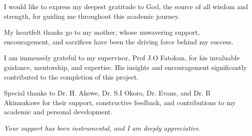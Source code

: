 \vspace*{2cm}
  
  \large
  I would like to express my deepest gratitude to God, the source of all wisdom and strength, for guiding me throughout this academic journey.

  \vspace{0.5cm}
  My heartfelt thanks go to my mother, whose unwavering support, encouragement, and sacrifices have been the driving force behind my success.

  \vspace{0.5cm}
  I am immensely grateful to my supervisor, Prof J.O Fatokun, for his invaluable guidance, mentorship, and expertise. His insights and encouragement significantly contributed to the completion of this project.

  \vspace{0.5cm}
  Special thanks to Dr. H. Akewe, Dr. S.I Okoro, Dr. Evans, and Dr. B Akinnukawe for their support, constructive feedback, and contributions to my academic and personal development.

  \vspace{2cm}
  \textit{Your support has been instrumental, and I am deeply appreciative.}
